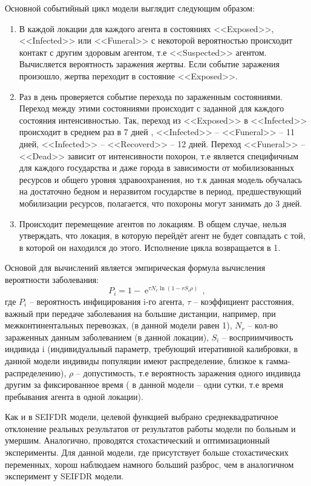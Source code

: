 Основной событийный цикл модели выглядит следующим образом:
\begin{enumerate}
	\item В каждой локации для каждого агента в состояниях <<Exposed>>, <<Infected>> или <<Funeral>>  с некоторой вероятностью происходит контакт с другим   здоровым агентом, т.е <<Suspected>> агентом. Вычисляется вероятность заражения жертвы. Если событие заражения произошло, жертва переходит в состояние <<Exposed>>.
	\item Раз в день проверяется событие перехода по зараженным состояниями. Переход между этими состояниями происходит с заданной для каждого состояния интенсивностью. Так, переход из <<Exposed>> в <<Infected>> происходит в среднем раз в 7 дней %
	,  <<Infected>> -- <<Funeral>> -- 11 дней, <<Infected>> -- <<Recoverd>> -- 12 дней. Переход <<Funeral>> -- <<Dead>> зависит от интенсивности похорон, т.е является специфичным для каждого государства и даже города в зависимости от мобилизованных ресурсов и общего уровня здравоохранения, но т.к данная модель обучалась на достаточно бедном и неразвитом государстве в период, предшествующий мобилизации ресурсов, полагается, что похороны могут занимать до 3 дней. 
	\item Происходит перемещение агентов по локациям. В общем случае, нельзя утверждать, что локация, в которую перейдёт агент не будет совпадать с той, в которой он находился до этого. Исполнение цикла возвращается в 1. 
\end{enumerate}

Основой для вычислений является эмпирическая формула  вычисления вероятности заболевания:
\begin{equation}\label{stohastic_eq:1}
P_i = 1 - \operatorname{e}^{\tau N_r \ln(1-rS_i\rho)} \,,
\end{equation}
где $P_i$ -- вероятность инфицирования  i-го агента, $\tau$  -- коэффициент расстояния, важный при передаче заболевания на большие дистанции, например, при межконтинентальных перевозках, (в данной модели равен 1), $N_r$ -- кол-во зараженных данным заболеванием (в данной локации), $S_i$ -- восприимчивость индивида i (индивидуальный параметр, требующий итеративной калибровки, в данной модели индивиды популяции имеют распределение, близкое к гамма-распределению), $\rho$ -- допустимость, т.е вероятность заражения одного индивида другим за фиксированное время ( в данной модели -- одни сутки, т.е время пребывания агента в одной локации).

Как и в SEIFDR модели, целевой функцией выбрано среднеквадратичное отклонение реальных результатов от результатов работы модели по  больным и умершим. Аналогично, проводятся стохастический и оптимизационный эксперименты. 
Для данной модели, где присутствует больше стохастических переменных, хорош наблюдаем намного больший разброс, чем в аналогичном эксперимент у SEIFDR модели.

